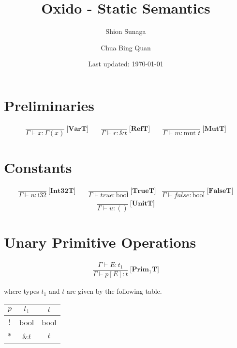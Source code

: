 \documentclass[11pt]{article}
\title{Oxido - Static Semantics}
\author{
    Shion Sunaga
    \and
    Chua Bing Quan
}
\date{Last updated: \today}
\begin{document}
    \maketitle

    \section*{Preliminaries}
    \begin{align*}
        \dfrac{}{\Gamma \vdash x : \Gamma(x)} \ \textbf{[VarT]} & \quad
        \dfrac{}{\Gamma \vdash r : \text{\&}t} \ \textbf{[RefT]} & \quad
        \dfrac{}{\Gamma \vdash m : \text{mut }t} \ \textbf{[MutT]}
    \end{align*}

    \section*{Constants}
    \begin{align*}
        \dfrac{}{\Gamma \vdash n : \text{i32}} \ \textbf{[Int32T]} & \quad
        \dfrac{}{\Gamma \vdash true : \text{bool}} \ \textbf{[TrueT]} &
        \dfrac{}{\Gamma \vdash false : \text{bool}} \ \textbf{[FalseT]}
    \end{align*}
    \begin{align*}
        \dfrac{}{\Gamma \vdash u : ()} \ \textbf{[UnitT]}
    \end{align*}

    \section*{Unary Primitive Operations}
    \begin{align*}
        \dfrac{\Gamma \vdash E:t_1}{\Gamma \vdash p[E] : t} \ \textbf{[Prim$_1$T]}
    \end{align*}

    \begin{flushleft}
        where types $t_1$ and $t$ are given by the following table. \newline

        \begin{tabular}{|c|c|c|}
            \hline
            $p$ & $t_1$ & $t$ \\ \hline
            $!$ & bool & bool \\ \hline
            $*$ & \&$t$ & $t$ \\ \hline
        \end{tabular}
    \end{flushleft}
\end{document}
